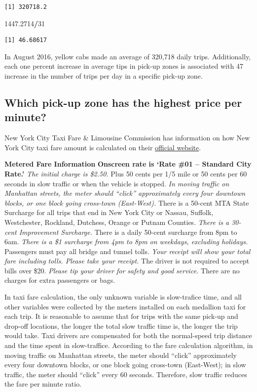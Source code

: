 \documentclass[12pt,twoside]{reedthesis}
\newenvironment{Shaded}{\begin{snugshade}}{\end{snugshade}}
\newcommand{\DecValTok}[1]{\textcolor[rgb]{0.00,0.00,0.81}{#1}}
\newcommand{\FloatTok}[1]{\textcolor[rgb]{0.00,0.00,0.81}{#1}}
\newcommand{\OperatorTok}[1]{\textcolor[rgb]{0.81,0.36,0.00}{\textbf{#1}}}
\theoremstyle{definition}
\theoremstyle{definition}
\theoremstyle{definition}
\theoremstyle{remark}
\begin{document}
\begin{verbatim}
[1] 320718.2
\end{verbatim}
\begin{Shaded}
\begin{Highlighting}[]
\FloatTok{1447.2714}\OperatorTok{/}\DecValTok{31}
\end{Highlighting}
\end{Shaded}
\begin{verbatim}
[1] 46.68617
\end{verbatim}
In August 2016, yellow cabs made an average of 320,718 daily trips.
Additionally, each one percent increase in average tips in pick-up zones
is associated with 47 increase in the number of trips per day in a
specific pick-up zone.

\subsection{Which pick-up zone has the highest price per
minute?}\label{which-pick-up-zone-has-the-highest-price-per-minute}

New York City Taxi Fare \& Limousine Commission has information on how
New York City taxi fare amount is calculated on their
\href{http://www.nyc.gov/html/tlc/html/passenger/taxicab_rate.shtml}{official
website}.

\textbf{Metered Fare Information} \textbf{Onscreen rate is `Rate \#01 --
Standard City Rate.'} \emph{The initial charge is \$2.50. }Plus 50 cents
per 1/5 mile or 50 cents per 60 seconds in slow traffic or when the
vehicle is stopped. \emph{In moving traffic on Manhattan streets, the
meter should ``click'' approximately every four downtown blocks, or one
block going cross-town (East-West). }There is a 50-cent MTA State
Surcharge for all trips that end in New York City or Nassau, Suffolk,
Westchester, Rockland, Dutchess, Orange or Putnam Counties. \emph{There
is a 30-cent Improvement Surcharge. }There is a daily 50-cent surcharge
from 8pm to 6am. \emph{There is a \$1 surcharge from 4pm to 8pm on
weekdays, excluding holidays. }Passengers must pay all bridge and tunnel
tolls. \emph{Your receipt will show your total fare including tolls.
Please take your receipt. }The driver is not required to accept bills
over \$20. \emph{Please tip your driver for safety and good service.
}There are no charges for extra passengers or bags.

In taxi fare calculation, the only unknown variable is slow-trafice
time, and all other variables were collected by the meters installed on
each medallion taxi for each trip. It is reasonable to assume that for
trips with the same pick-up and drop-off locations, the longer the total
slow traffic time is, the longer the trip would take. Taxi drivers are
compensated for both the normal-speed trip distance and the time spent
in slow-traffice. According to the fare calculation algorithm, in moving
traffic on Manhattan streets, the meter should ``click'' approximately
every four downtown blocks, or one block going cross-town (East-West);
in slow traffic, the meter should ``click'' every 60 seconds. Therefore,
slow traffic reduces the fare per minute ratio.
\end{document}
